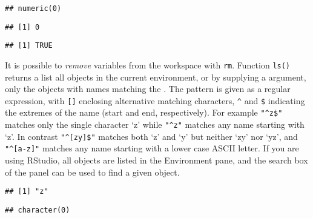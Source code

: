 \documentclass[paper=a4,headsepline,BCOR=12mm,twoside,open=right,%
titlepage,headings=small,fontsize=10pt,index=totoc,bibliography=totoc,%
captions=tableheading,captions=nooneline]{scrbook}\usepackage{knitr}
\begin{document}
\begin{knitrout}\footnotesize
{}\color{fgcolor}\begin{kframe}
\begin{alltt}
 \hlkwb{<-} \hlstd{(}\hlstd{)}
\end{alltt}
\begin{verbatim}
## numeric(0)
\end{verbatim}
\begin{alltt}
\end{alltt}
\begin{verbatim}
## [1] 0
\end{verbatim}
\begin{alltt}
\end{alltt}
\begin{verbatim}
## [1] TRUE
\end{verbatim}
\end{kframe}
\end{knitrout}

It is possible to \emph{remove} variables from the workspace with \texttt{rm}. Function \texttt{ls()} returns a list all objects in the current environment, or by supplying a  argument, only the objects with names matching the . The pattern is given as a regular expression, with \verb|[]| enclosing alternative matching characters, \verb|^| and \verb|$| indicating the extremes of the name (start and end, respectively). For example \verb|"^z$"| matches only the single character `z' while \verb|"^z"| matches any name starting with `z'. In contrast \verb|"^[zy]$"| matches both `z' and `y' but neither `zy' nor `yz', and \verb|"^[a-z]"| matches any name starting with a lower case ASCII letter. If you are using RStudio, all objects are listed in the Environment pane, and the search box of the panel can be used to find a given object.

\begin{knitrout}\footnotesize
{}\color{fgcolor}\begin{kframe}
\begin{alltt}
\hlstd{(}\hlstd{=}\hlstd{)}
\end{alltt}
\begin{verbatim}
## [1] "z"
\end{verbatim}
\begin{alltt}
\hlstd{(}\hlstd{=}\hlstd{)}
\end{alltt}
\begin{verbatim}
## character(0)
\end{verbatim}
\end{kframe}
\end{knitrout}
\end{document}
